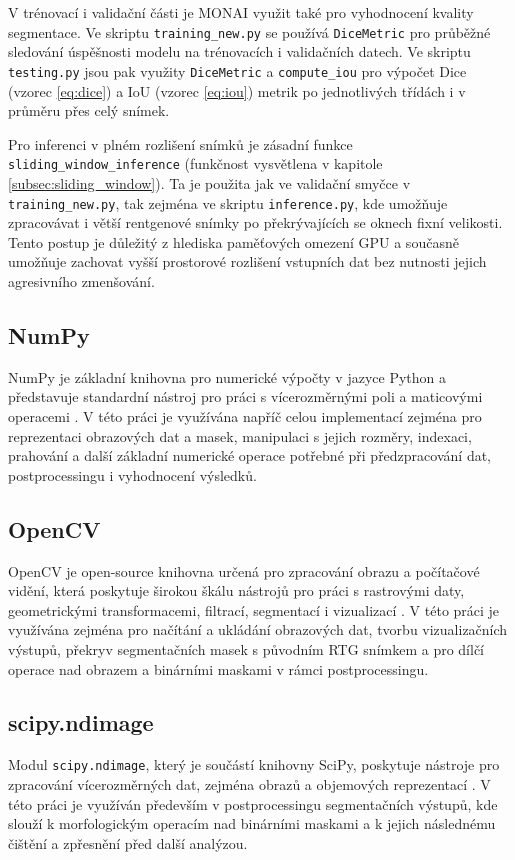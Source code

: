 \documentclass[male,czech,api_bc]{kitheses}
\begin{document}
V trénovací i validační části je MONAI využit také pro vyhodnocení kvality segmentace. Ve skriptu \texttt{training\_new.py} se používá \texttt{DiceMetric} pro průběžné sledování úspěšnosti modelu na trénovacích i validačních datech. Ve skriptu \texttt{testing.py} jsou pak využity \texttt{DiceMetric} a \texttt{compute\_iou} pro výpočet Dice (vzorec \ref{eq:dice}) a IoU (vzorec \ref{eq:iou}) metrik po jednotlivých třídách i v průměru přes celý snímek.

Pro inferenci v plném rozlišení snímků je zásadní funkce \texttt{sliding\-\_window\-\_infere\-nce} (funkčnost vysvětlena v kapitole \ref{subsec:sliding_window}). Ta je použita jak ve validační smyčce v \texttt{training\-\_new.py}, tak zejména ve skriptu \texttt{inference.py}, kde umožňuje zpracovávat i větší rentgenové snímky po překrývajících se oknech fixní velikosti. Tento postup je důležitý z hlediska paměťových omezení GPU a současně umožňuje zachovat vyšší prostorové rozlišení vstupních dat bez nutnosti jejich agresivního zmenšování.

\subsection*{NumPy}
NumPy je základní knihovna pro numerické výpočty v jazyce Python a představuje standardní nástroj pro práci s vícerozměrnými poli a maticovými operacemi \cite{Harris2020NumPy}. V této práci je využívána napříč celou implementací zejména pro reprezentaci obrazových dat a masek, manipulaci s jejich rozměry, indexaci, prahování a další základní numerické operace potřebné při předzpracování dat, postprocessingu i vyhodnocení výsledků.


\subsection*{OpenCV}
OpenCV je open-source knihovna určená pro zpracování obrazu a počítačové vidění, která poskytuje širokou škálu nástrojů pro práci s rastrovými daty, geometrickými transformacemi, filtrací, segmentací i vizualizací \cite{Bradski2000OpenCV}. V této práci je využívána zejména pro načítání a ukládání obrazových dat, tvorbu vizualizačních výstupů, překryv segmentačních masek s původním RTG snímkem a pro dílčí operace nad obrazem a binárními maskami v rámci postprocessingu.


\subsection*{scipy.ndimage}
Modul \texttt{scipy.ndimage}, který je součástí knihovny SciPy, poskytuje nástroje pro zpracování vícerozměrných dat, zejména obrazů a objemových reprezentací \cite{Virtanen2020SciPy}. V této práci je využíván především v postprocessingu segmentačních výstupů, kde slouží k morfologickým operacím nad binárními maskami a k jejich následnému čištění a zpřesnění před další analýzou.
\end{document}
